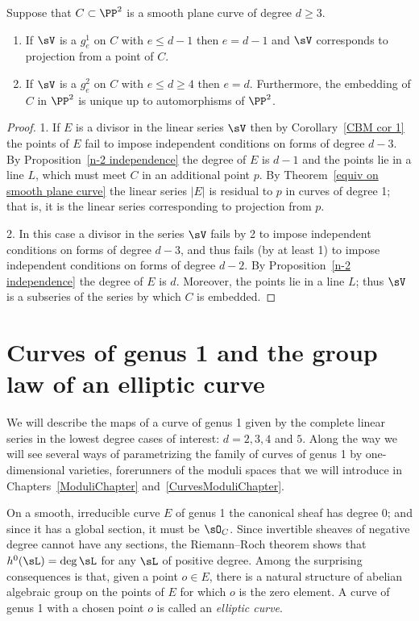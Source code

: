 \begin{corollary}\label{CBM cor 2}
 Suppose that $C\subset \PP^2$ is a smooth plane curve of degree $d\geq 3$.
 
\begin{enumerate}
 \item If $\sV$ is a $g^1_e$ on $C$ with $e\leq d-1$ then $e = d-1$ and $\sV$
 corresponds to projection from a point of $C$.
 \item If $\sV$ is a $g^2_e$ on $C$ with $e\leq d \geq 4$ then $e = d$. Furthermore,  the
  embedding of $C$ in $\PP^2$ is unique up to automorphisms of $\PP^2$.
 \end{enumerate}
\end{corollary}

\begin{proof}
 1. If $E$ is a divisor in the linear series $\sV$ then by Corollary~\ref{CBM cor 1} the points of $E$ fail to impose
 independent conditions on forms of degree $d-3$. By Proposition~\ref{n-2 independence} the degree of $E$ is $d-1$
 and the points lie in a line $L$, which must meet $C$ in an additional point $p$. By Theorem~\ref{equiv on smooth plane curve}
 the linear series $|E|$ is residual to $p$ in curves of degree 1; that is, it is the linear series corresponding to projection from $p$.
 
 2. In this case a divisor in the series $\sV$ fails by 2 to impose independent conditions on forms of degree $d-3$, and
 thus fails (by at least 1) to impose independent conditions on forms of degree $d-2$. By 
  Proposition~\ref{n-2 independence} the degree of $E$ is $d$.
 Moreover, the points lie in a line $L$; thus $\sV$ is a subseries of the series by which $C$ is embedded.
 \end{proof}

\section{Curves of genus 1 and the group law of an elliptic curve}

We will describe the maps of a curve of genus 1 given by
the complete linear series in the lowest degree cases of interest: $d =  2, 3, 4$ and $5$. Along the
way we will see several ways of parametrizing the family of curves of genus 1 by one-dimensional varieties,
forerunners of the moduli spaces that we will introduce in Chapters~\ref{ModuliChapter} and~\ref{CurvesModuliChapter}.


On a smooth, irreducible curve $E$ of genus 1 the canonical sheaf has degree 0; and since it has a global section, it must be $\sO_C$.
Since invertible sheaves of negative degree cannot have any sections, the Riemann--Roch theorem shows that
$h^0( \sL) = \deg \sL$ for any $\sL$ of positive degree. Among the surprising consequences is that, given
a point $o\in E$, there is a natural structure of abelian algebraic group on the points of $E$ for which $o$
is the zero element. A curve of genus 1 with a chosen point $o$ is called an \emph{elliptic curve}.

